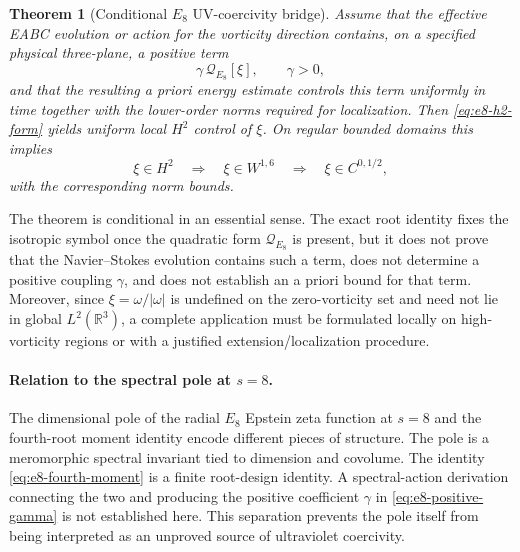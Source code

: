 \documentclass{article}
\newtheorem{theorem}{Theorem}[section]
\begin{document}
\begin{theorem}[Conditional $E_8$ UV-coercivity bridge]
Assume that the effective EABC evolution or action for the vorticity direction
contains, on a specified physical three-plane, a positive term
\begin{equation}
\gamma\,\mathcal Q_{E_8}[\xi],
\qquad \gamma>0,
\label{eq:e8-positive-gamma}
\end{equation}
and that the resulting a priori energy estimate controls this term uniformly
in time together with the lower-order norms required for localization.  Then
\eqref{eq:e8-h2-form} yields uniform local $H^2$ control of $\xi$.  On regular
bounded domains this implies
\begin{equation}
\xi\in H^2
\quad\Longrightarrow\quad
\xi\in W^{1,6}
\quad\Longrightarrow\quad
\xi\in C^{0,1/2},
\end{equation}
with the corresponding norm bounds.
\end{theorem}

The theorem is conditional in an essential sense.  The exact root identity
fixes the isotropic symbol once the quadratic form $\mathcal Q_{E_8}$ is
present, but it does not prove that the Navier--Stokes evolution contains such
a term, does not determine a positive coupling $\gamma$, and does not establish
an a priori bound for that term.  Moreover, since $\xi=\omega/|\omega|$ is
undefined on the zero-vorticity set and need not lie in global $L^2(\mathbb
R^3)$, a complete application must be formulated locally on high-vorticity
regions or with a justified extension/localization procedure.

\paragraph{Relation to the spectral pole at $s=8$.}
The dimensional pole of the radial $E_8$ Epstein zeta function at $s=8$ and
the fourth-root moment identity encode different pieces of structure.  The
pole is a meromorphic spectral invariant tied to dimension and covolume.  The
identity \eqref{eq:e8-fourth-moment} is a finite root-design identity.  A
spectral-action derivation connecting the two and producing the positive
coefficient $\gamma$ in \eqref{eq:e8-positive-gamma} is not established here.
This separation prevents the pole itself from being interpreted as an
unproved source of ultraviolet coercivity.
\end{document}
